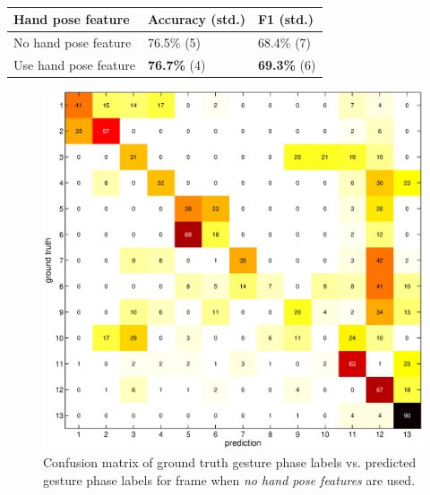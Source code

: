 \documentclass{sigchi}
\newcommand\tabhead[1]{\small\textbf{#1}}
\begin{document}
\begin{table}
\centering
\begin{tabular}{|l|l|l|}
\hline
\tabhead{Hand pose feature} & \tabhead{Accuracy (std.)} & \tabhead{F1 (std.)}\\
\hline
No hand pose feature & 76.5\% (5) & 68.4\% (7)\\
\hline
Use hand pose feature  & \textbf{76.7\%} (4) & \textbf{69.3\%} (6) \\
\hline
\end{tabular}
\caption{}
\label{tab:hand-pose-feature}
\end{table}

\begin{figure}
\centering
\includegraphics[width=1\columnwidth]{figure/cm9.eps}
\caption{Confusion matrix of ground truth gesture phase labels vs. predicted
gesture phase labels for frame when \textit{no hand pose features} are used.}
\label{fig:cm9}
\end{figure}
\end{document}
